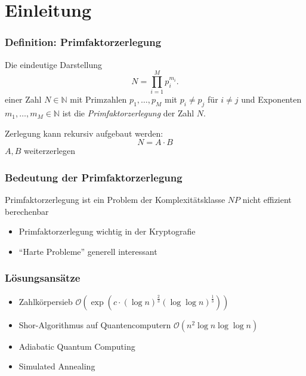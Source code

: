 \section{Einleitung}

\begin{frame}
  \frametitle{Definition: Primfaktorzerlegung}
  \begin{definition}
    Die eindeutige Darstellung
    \begin{equation*}
      N=\prod\limits_{i=1}^M p_i^{m_i}.
    \end{equation*}
    einer Zahl $N\in\mathbb{N}$ mit Primzahlen $p_1,\dots,p_M$ mit $p_i \neq p_j$ für $i \neq j$ und Exponenten $m_1,\dots,m_M\in\mathbb{N}$ ist die \textit{Primfaktorzerlegung} der Zahl $N$.
  \end{definition}
  \pause{}

  Zerlegung kann rekursiv aufgebaut werden:
  \begin{equation*}
    N=A\cdot B
  \end{equation*}
  \Rightarrow{} $A, B$ weiterzerlegen
\end{frame}

\begin{frame}
  \frametitle{Bedeutung der Primfaktorzerlegung}
  Primfaktorzerlegung ist ein Problem der Komplexitätsklasse $NP$
  \pause{}
  \Rightarrow{} nicht effizient berechenbar
  \pause{}
  \begin{itemize}
    \item Primfaktorzerlegung wichtig in der Kryptografie
    \item ``Harte Probleme'' generell interessant
  \end{itemize}
\end{frame}

\begin{frame}
  \frametitle{Lösungsansätze}
  \begin{itemize}
    \setlength{\itemsep}{5pt}
    \item Zahlkörpersieb $\mathcal{O}\left(\exp\left(c\cdot {\left(\log n\right)}^{\frac{2}{3}}{\left(\log\log n\right)}^{\frac{1}{3}}\right)\right)$~\cite{pomerance}
    \item Shor-Algorithmus auf Quantencomputern $\mathcal{O}\left(n^2 \log n \log\log n\right)$~\cite{shor}
    \item Adiabatic Quantum Computing~\cite{suter,xu}
    \item Simulated Annealing~\cite{altschuler}
  \end{itemize}
\end{frame}
